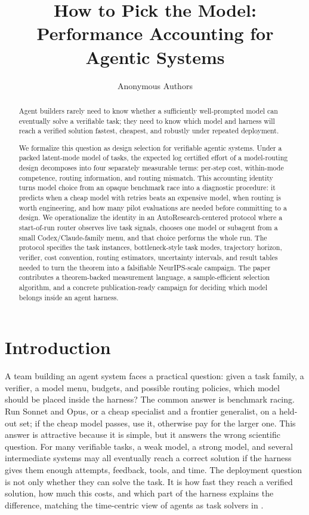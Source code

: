 \documentclass{article}
\title{How to Pick the Model:\\
Performance Accounting for Agentic Systems}
\author{Anonymous Authors}
\newcounter{algorithm}
\begin{document}
\maketitle

\begin{abstract}
Agent builders rarely need to know whether a sufficiently well-prompted model can eventually solve a verifiable task; they need to know which model and harness will reach a verified solution fastest, cheapest, and robustly under repeated deployment.

We formalize this question as design selection for verifiable agentic systems.
Under a packed latent-mode model of tasks, the expected log certified effort of a model-routing design decomposes into four separately measurable terms: per-step cost, within-mode competence, routing information, and routing mismatch.
This accounting identity turns model choice from an opaque benchmark race into a diagnostic procedure: it predicts when a cheap model with retries beats an expensive model, when routing is worth engineering, and how many pilot evaluations are needed before committing to a design.
We operationalize the identity in an AutoResearch-centered protocol where a start-of-run router observes live task signals, chooses one model or subagent from a small Codex/Claude-family menu, and that choice performs the whole run.
The protocol specifies the task instances, bottleneck-style task modes, trajectory horizon, verifier, cost convention, routing estimators, uncertainty intervals, and result tables needed to turn the theorem into a falsifiable NeurIPS-scale campaign.
The paper contributes a theorem-backed measurement language, a sample-efficient selection algorithm, and a concrete publication-ready campaign for deciding which model belongs inside an agent harness.
\end{abstract}

\section{Introduction}
\label{sec:intro}

A team building an agent system faces a practical question: given a task family, a verifier, a model menu, budgets, and possible routing policies, which model should be placed inside the harness?
The common answer is benchmark racing.
Run Sonnet and Opus, or a cheap specialist and a frontier generalist, on a held-out set; if the cheap model passes, use it, otherwise pay for the larger one.
This answer is attractive because it is simple, but it answers the wrong scientific question.
For many verifiable tasks, a weak model, a strong model, and several intermediate systems may all eventually reach a correct solution if the harness gives them enough attempts, feedback, tools, and time.
The deployment question is not only whether they can solve the task.
It is how fast they reach a verified solution, how much this costs, and which part of the harness explains the difference, matching the time-centric view of agents as task solvers in \citet{achille2025agents}.
\end{document}
